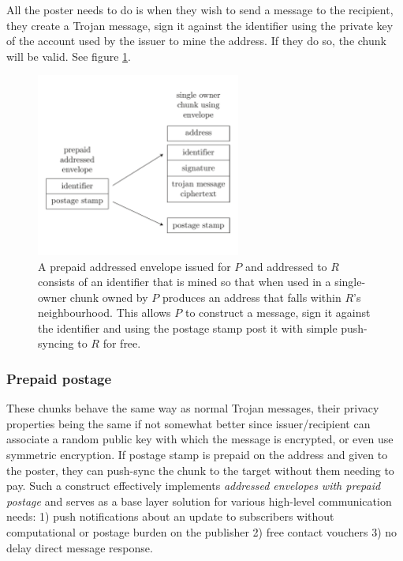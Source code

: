 All the poster needs to do is when they wish to send a message to the recipient, they create a Trojan message, sign it against the identifier using the private key of the account used by the issuer to mine the address. If they do so, the chunk will be valid. See figure \ref{fig:addressed-envelope}.


\begin{figure}[htbp]
   \centering
   \includegraphics[width=0.6\textwidth]{fig/addressed-envelope.pdf}
   \caption[Prepaid addressed envelopes \statusgreen]{A prepaid addressed envelope issued for $P$ and addressed to $R$ consists of an identifier that is mined so that when used in  a single-owner chunk owned by $P$ produces an address that falls within $R$'s neighbourhood. This allows $P$ to construct a message, sign it against the identifier and using the postage stamp   post it   with simple push-syncing to $R$ for free. }
   \label{fig:addressed-envelope}
\end{figure}

\subsubsection{Prepaid postage}

These chunks behave the same way as normal Trojan messages, their privacy properties being the same if not somewhat better since issuer/recipient can associate a random public key with which the message is encrypted, or even use symmetric encryption. If postage stamp is prepaid on the address and given to the poster, they can push-sync the chunk to the target without them needing to pay. Such a construct effectively implements \emph{addressed envelopes with prepaid postage} and serves as a  base layer solution for various high-level communication needs: 1) push notifications about an update to subscribers without computational or postage burden on the publisher 2) free contact vouchers 3) no delay direct message response.  



